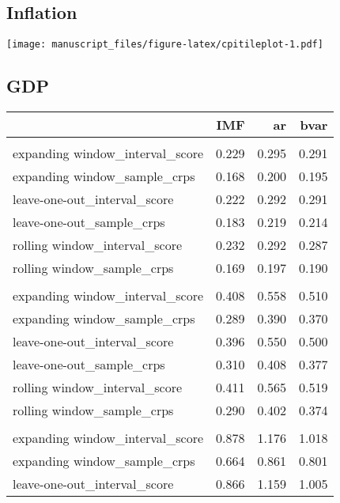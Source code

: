 \documentclass[
]{article}
\begin{document}
\hypertarget{inflation-2}{%
\subsection{Inflation}\label{inflation-2}}

\texttt{[image: manuscript\_files/figure-latex/cpitileplot-1.pdf]}

\hypertarget{gdp-2}{%
\subsection{GDP}\label{gdp-2}}

\begin{longtable}{l|rrr}
\toprule
\multicolumn{1}{l}{} & IMF & ar & bvar \\ 
\midrule\addlinespace[2.5pt]
\multicolumn{4}{l}{horizon = 0} \\ 
\midrule\addlinespace[2.5pt]
expanding window\_interval\_score & 0.229 & 0.295 & 0.291 \\ 
expanding window\_sample\_crps & 0.168 & 0.200 & 0.195 \\ 
leave-one-out\_interval\_score & 0.222 & 0.292 & 0.291 \\ 
leave-one-out\_sample\_crps & 0.183 & 0.219 & 0.214 \\ 
rolling window\_interval\_score & 0.232 & 0.292 & 0.287 \\ 
rolling window\_sample\_crps & 0.169 & 0.197 & 0.190 \\ 
\midrule\addlinespace[2.5pt]
\multicolumn{4}{l}{horizon = 0.5} \\ 
\midrule\addlinespace[2.5pt]
expanding window\_interval\_score & 0.408 & 0.558 & 0.510 \\ 
expanding window\_sample\_crps & 0.289 & 0.390 & 0.370 \\ 
leave-one-out\_interval\_score & 0.396 & 0.550 & 0.500 \\ 
leave-one-out\_sample\_crps & 0.310 & 0.408 & 0.377 \\ 
rolling window\_interval\_score & 0.411 & 0.565 & 0.519 \\ 
rolling window\_sample\_crps & 0.290 & 0.402 & 0.374 \\ 
\midrule\addlinespace[2.5pt]
\multicolumn{4}{l}{horizon = 1} \\ 
\midrule\addlinespace[2.5pt]
expanding window\_interval\_score & 0.878 & 1.176 & 1.018 \\ 
expanding window\_sample\_crps & 0.664 & 0.861 & 0.801 \\ 
leave-one-out\_interval\_score & 0.866 & 1.159 & 1.005 \\ 

\end{longtable}
\end{document}
